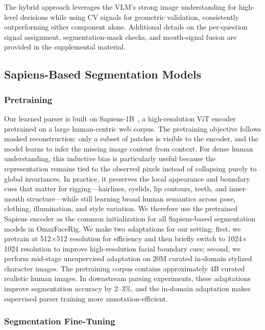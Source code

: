 \documentclass[acmtog,anonymous,review]{acmart}
\begin{document}
The hybrid approach leverages the VLM's strong image understanding for high-level decisions while using CV signals for geometric validation, consistently outperforming either component alone. Additional details on the per-question signal assignment, segmentation-mask checks, and mouth-signal fusion are provided in the supplemental material.

\subsection{Sapiens-Based Segmentation Models}
\label{sec:seg_models}

\subsubsection{Pretraining}

Our learned parser is built on Sapiens-1B~\cite{khirodkar2025sapiens}, a high-resolution ViT encoder pretrained on a large human-centric web corpus. The pretraining objective follows masked reconstruction: only a subset of patches is visible to the encoder, and the model learns to infer the missing image content from context. For dense human understanding, this inductive bias is particularly useful because the representation remains tied to the observed pixels instead of collapsing purely to global invariances. In practice, it preserves the local appearance and boundary cues that matter for rigging---hairlines, eyelids, lip contours, teeth, and inner-mouth structure---while still learning broad human semantics across pose, clothing, illumination, and style variation. We therefore use the pretrained Sapiens encoder as the common initialization for all Sapiens-based segmentation models in OmniFaceRig. We make two adaptations for our setting: first, we pretrain at 512$\times$512 resolution for efficiency and then briefly switch to 1024$\times$1024 resolution to improve high-resolution facial boundary cues; second, we perform mid-stage unsupervised adaptation on 20M curated in-domain stylized character images. The pretraining corpus contains approximately 4B curated realistic human images. In downstream parsing experiments, these adaptations improve segmentation accuracy by 2--3\%, and the in-domain adaptation makes supervised parser training more annotation-efficient.

\subsubsection{Segmentation Fine-Tuning}
\end{document}
